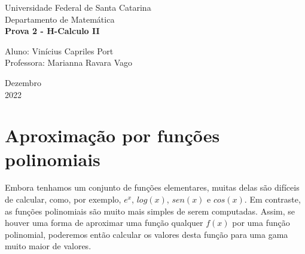 \documentclass[a4paper, 12pt]{article}
\begin{document}

\begin{titlepage}
	\begin{center}


		\Huge{Universidade Federal de Santa Catarina}\\
		\large{Departamento de Matemática}\\
		\vspace{15pt}
		\vspace{95pt}
		\textbf{\LARGE{Prova 2 - H-Calculo II }}\\
		\vspace{3,5cm}
	\end{center}

	\begin{flushleft}
		\begin{tabbing}
			Aluno:  Vinícius Capriles Port\\
			Professora: Marianna Ravara Vago\\
		\end{tabbing}
	\end{flushleft}
	\vspace{1cm}

	\begin{center}
		\vspace{\fill}
		Dezembro\\
		2022
	\end{center}
\end{titlepage}


\newpage
\tableofcontents
\thispagestyle{empty}

\newpage
{}
\section{Aproximação por funções polinomiais}

Embora tenhamos um conjunto de funções elementares, muitas delas são difíceis de calcular,
como, por exemplo, $e^x$, $log(x)$, $sen(x)$ e $cos(x)$. Em contraste,
as funções polinomiais são muito mais simples de serem computadas.
Assim, se houver uma forma de aproximar uma função qualquer $f(x)$ por uma função polinomial,
poderemos então calcular os valores desta função para uma gama muito maior de valores.
\end{document}
